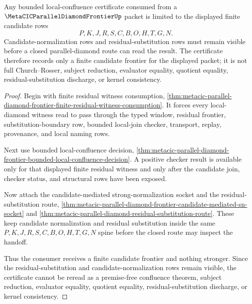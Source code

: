 \begin{theorem}
\label{thm:metacic-parallel-diamond-finite-candidate-frontier}
Any bounded local-confluence certificate consumed from a $\MetaCICParallelDiamondFrontierUp$ packet is limited to the displayed finite candidate rows
$$
P,K,J,R,S,C,B,O,H,T,G,N.
$$
Candidate-normalization rows and residual-substitution rows must remain visible before a closed parallel-diamond route can read the result. The certificate therefore records only a finite candidate frontier for the displayed packet; it is not full Church--Rosser, subject reduction, evaluator equality, quotient equality, residual-substitution discharge, or kernel consistency.
\end{theorem}
\begin{proof}
Begin with finite residual witness consumption, \autoref{thm:metacic-parallel-diamond-frontier-finite-residual-witness-consumption}. It forces every local-diamond witness read to pass through the typed window, residual frontier, substitution-boundary row, bounded local-join checker, transport, replay, provenance, and local naming rows.

Next use bounded local-confluence decision, \autoref{thm:metacic-parallel-diamond-frontier-bounded-local-confluence-decision}. A positive checker result is available only for that displayed finite residual witness and only after the candidate join, checker status, and structural rows have been exposed.

Now attach the candidate-mediated strong-normalization socket and the residual-substitution route, \autoref{thm:metacic-parallel-diamond-frontier-candidate-mediated-sn-socket} and \autoref{thm:metacic-parallel-diamond-residual-substitution-route}. These keep candidate normalization and residual substitution inside the same $P,K,J,R,S,C,B,O,H,T,G,N$ spine before the closed route may inspect the handoff.

Thus the consumer receives a finite candidate frontier and nothing stronger. Since the residual-substitution and candidate-normalization rows remain visible, the certificate cannot be reread as a premise-free confluence theorem, subject reduction, evaluator equality, quotient equality, residual-substitution discharge, or kernel consistency.
\end{proof}
